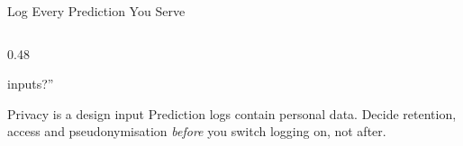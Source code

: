 \begin{frame}{Log Every Prediction You Serve}
\begin{columns}[T]
\begin{column}{0.48\textwidth}
\begin{tcolorbox}[colback=blue!5, colframe=blue!50, title=\small What this buys you]
\begin{itemize}
                          inputs?''
                \end{itemize}
            \end{tcolorbox}
            \vspace{0.4em}
            \begin{alertblock}{\small Privacy is a design input}
                \small Prediction logs contain personal data. Decide retention, access and pseudonymisation
                \emph{before} you switch logging on, not after.
            \end{alertblock}
        \end{column}
    \end{columns}

\end{frame}
